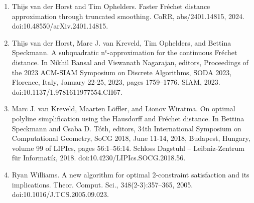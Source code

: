 \begin{enumerate}
\item[]  [26]  Thijs van der Horst and Tim Ophelders.  Faster Fréchet distance approximation through truncated smoothing.  CoRR, abs/2401.14815, 2024.  doi:10.48550/arXiv.2401.14815.  
\item[]  [27]  Thijs van der Horst, Marc J. van Kreveld, Tim Ophelders, and Bettina Speckmann.  A subquadratic n${}^{\mbox{{$\epsilon$}}}$-approximation for the continuous Fréchet distance.  In Nikhil Bansal and Viswanath Nagarajan, editors, Proceedings of the 2023 ACM-SIAM Symposium on Discrete Algorithms, SODA 2023, Florence, Italy, January 22-25, 2023, pages 1759–1776. SIAM, 2023.  doi:10.1137/1.9781611977554.CH67.  
\item[]  [28]  Marc J. van Kreveld, Maarten Löffler, and Lionov Wiratma.  On optimal polyline simplification using the Hausdorff and Fréchet distance.  In Bettina Speckmann and Csaba D. Tóth, editors, 34th International Symposium on Computational Geometry, SoCG 2018, June 11-14, 2018, Budapest, Hungary, volume 99 of LIPIcs, pages 56:1–56:14. Schloss Dagstuhl – Leibniz-Zentrum für Informatik, 2018.  doi:10.4230/LIPIcs.SOCG.2018.56.  
\item[]  [29]  Ryan Williams.  A new algorithm for optimal 2-constraint satisfaction and its implications.  Theor. Comput. Sci., 348(2-3):357–365, 2005.  doi:10.1016/J.TCS.2005.09.023.  
\end{enumerate}
